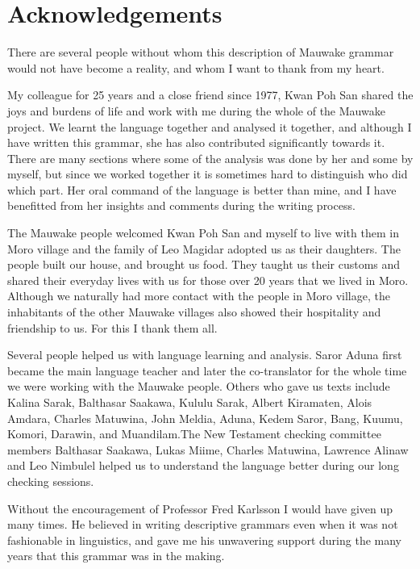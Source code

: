 

\section*{Acknowledgements}

There are several people without whom this description of Mauwake grammar would not have become a reality, and whom I want to thank from my heart.

My colleague for 25 years and a close friend since 1977, Kwan Poh San shared the joys and burdens of life and work with me during the whole of the Mauwake project. We learnt the language together and analysed it together, and although I have written this grammar, she has also contributed significantly towards it.  There are many sections where some of the analysis was done by her and some by myself, but since we worked together it is sometimes hard to distinguish who did which part. Her oral command of the language is better than mine, and I have benefitted from her insights and comments during the writing process.  

The Mauwake people welcomed Kwan Poh San and myself to live with them in Moro village and the family of Leo Magidar adopted us as their daughters. The people built our house, and brought us food. They taught us their customs and shared their everyday lives with us for those over 20 years that we lived in Moro. Although we naturally had more contact with the people in Moro village, the inhabitants of the other Mauwake villages also showed their hospitality and friendship to us. For this I thank them all. 

Several people helped us with language learning and analysis. Saror Aduna first became the main language teacher and later the co-translator for the whole time we were working with the Mauwake people. Others who gave us texts include Kalina Sarak, Balthasar Saakawa, Kululu Sarak, Albert Kiramaten, Alois Amdara, Charles Matuwina, John Meldia, Aduna, Kedem Saror, Bang, Kuumu, Komori, Darawin, and Muandilam.The New Testament checking committee members Balthasar Saakawa, Lukas Miime, Charles Matuwina, Lawrence Alinaw and Leo Nimbulel helped us to understand the language better during our long checking sessions.

Without the encouragement of Professor Fred Karlsson I would have given up many times. He believed in writing descriptive grammars even when it was not fashionable in linguistics, and gave me his unwavering support during the many years that this grammar was in the making.


